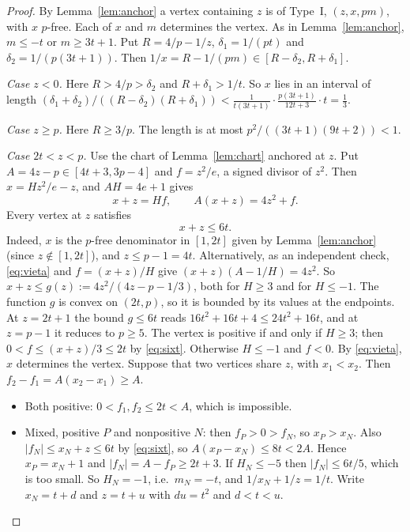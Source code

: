 \documentclass[11pt,reqno]{amsart}
\theoremstyle{definition}
\begin{document}
\begin{proof}
By Lemma~\ref{lem:anchor} a vertex containing $z$ is of Type~I,
$(z,x,pm)$, with $x$ $p$-free.  Each of $x$ and $m$ determines the vertex.
As in Lemma~\ref{lem:anchor}, $m\le-t$ or $m\ge3t+1$.  Put $R=4/p-1/z$,
$\delta_1=1/(pt)$ and $\delta_2=1/(p(3t+1))$.  Then
$1/x=R-1/(pm)\in[R-\delta_2,R+\delta_1]$.

\emph{Case $z<0$.}  Here $R>4/p>\delta_2$ and $R+\delta_1>1/t$.  So $x$ lies
in an interval of length
$(\delta_1+\delta_2)/((R-\delta_2)(R+\delta_1))<
\frac{1}{t(3t+1)}\cdot\frac{p(3t+1)}{12t+3}\cdot t=\frac13$.

\emph{Case $z\ge p$.}  Here $R\ge3/p$.  The length is at most
$p^2/((3t+1)(9t+2))<1$.

\emph{Case $2t<z<p$.}  Use the chart of Lemma~\ref{lem:chart} anchored at
$z$.  Put $A=4z-p\in[4t+3,3p-4]$ and $f=z^2/e$, a signed divisor of $z^2$.
Then $x=Hz^2/e-z$, and $AH=4e+1$ gives
\begin{equation}\label{eq:vieta}
 x+z=Hf,\qquad A(x+z)=4z^2+f .
\end{equation}
Every vertex at $z$ satisfies
\begin{equation}\label{eq:sixt}
 x+z\le6t .
\end{equation}
Indeed, $x$ is the $p$-free denominator in $[1,2t]$ given by
Lemma~\ref{lem:anchor} (since $z\notin[1,2t]$), and $z\le p-1=4t$.
Alternatively, as an independent check, \eqref{eq:vieta} and $f=(x+z)/H$ give
$(x+z)(A-1/H)=4z^2$.  So $x+z\le g(z):=4z^2/(4z-p-1/3)$, both for $H\ge3$
and for $H\le-1$.  The function $g$ is convex on $(2t,p)$, so it is bounded
by its values at the endpoints.  At $z=2t+1$ the bound $g\le6t$ reads
$16t^2+16t+4\le24t^2+16t$, and at $z=p-1$ it reduces to $p\ge5$.  The
vertex is positive if and only if $H\ge3$; then
$0<f\le(x+z)/3\le2t$ by \eqref{eq:sixt}.  Otherwise $H\le-1$ and $f<0$.  By \eqref{eq:vieta}, $x$ determines
the vertex.  Suppose that two vertices share $z$, with $x_1<x_2$.  Then
$f_2-f_1=A(x_2-x_1)\ge A$.
\begin{itemize}
\item Both positive: $0<f_1,f_2\le2t<A$, which is impossible.
\item Mixed, positive $P$ and nonpositive $N$: then $f_P>0>f_N$, so
$x_P>x_N$.  Also $|f_N|\le x_N+z\le6t$ by \eqref{eq:sixt}, so $A(x_P-x_N)\le8t<2A$.  Hence
$x_P=x_N+1$ and $|f_N|=A-f_P\ge2t+3$.  If $H_N\le-5$ then
$|f_N|\le6t/5$, which is too small.  So $H_N=-1$, i.e.\ $m_N=-t$, and
$1/x_N+1/z=1/t$.  Write $x_N=t+d$ and $z=t+u$ with $du=t^2$ and $d<t<u$.

\end{itemize}
\end{proof}
\end{document}
